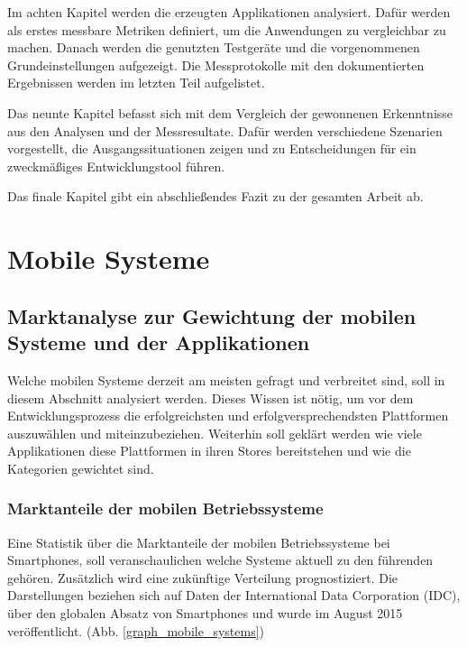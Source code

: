 \bigskip
Im achten Kapitel werden die erzeugten Applikationen analysiert. Dafür werden als erstes messbare Metriken definiert, um die Anwendungen zu vergleichbar zu machen. Danach werden die genutzten Testgeräte und die vorgenommenen Grundeinstellungen aufgezeigt. Die Messprotokolle mit den dokumentierten Ergebnissen werden im letzten Teil aufgelistet.

\bigskip
Das neunte Kapitel befasst sich mit dem Vergleich der gewonnenen Erkenntnisse aus den Analysen und der Messresultate. Dafür werden verschiedene Szenarien vorgestellt, die Ausgangssituationen zeigen und zu Entscheidungen für ein zweckmäßiges Entwicklungstool führen.

\bigskip
Das finale Kapitel gibt ein abschließendes Fazit zu der gesamten Arbeit ab.

\chapter{Mobile Systeme}

\section{Marktanalyse zur Gewichtung der mobilen Systeme und der Applikationen}
Welche mobilen Systeme derzeit am meisten gefragt und verbreitet sind, soll in diesem Abschnitt analysiert werden. Dieses Wissen ist nötig, um vor dem Entwicklungsprozess die erfolgreichsten und erfolgversprechendsten Plattformen auszuwählen und miteinzubeziehen.
Weiterhin soll geklärt werden wie viele Applikationen diese Plattformen in ihren Stores bereitstehen und wie die Kategorien gewichtet sind.

\subsection{Marktanteile der mobilen Betriebssysteme}
\label{subsec:Marktanteile_mobile_Systeme}
Eine Statistik über die Marktanteile der mobilen Betriebssysteme bei Smartphones, soll veranschaulichen welche Systeme aktuell zu den führenden gehören. Zusätzlich wird eine zukünftige Verteilung prognostiziert. Die Darstellungen beziehen sich auf Daten der International Data Corporation (IDC), über den globalen Absatz von Smartphones und wurde im August 2015 veröffentlicht. (Abb. \ref{graph_mobile_systems})

